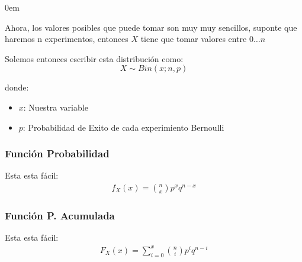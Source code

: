 \documentclass[12pt, fleqn]{report}                             %
\newenvironment{SmallIndentation}[1][0.75em]                    %
        {\begin{adjustwidth}{#1}{}\begin{footnotesize}}             %
        {\end{footnotesize}\end{adjustwidth}}                       %
\theoremstyle{break}                                            %
\begin{document}
\begin{multicols}{2}
\begin{SmallIndentation}[0em]
                            Ahora, los valores posibles que puede tomar son muy muy sencillos, suponte que haremos
                            n experimentos, entonces $X$ tiene que tomar valores entre $0 \dots n$

                            Solemos entonces escribir esta distribución como:
                            \begin{equation*}
                                X \sim Bin(x; n, p)
                            \end{equation*}

                            donde:
                            \begin{itemize}
                                \item $x$: Nuestra variable
                                \item $p$: Probabilidad de Exito de cada experimiento Bernoulli
                            \end{itemize}


                    \subsubsection{Función Probabilidad}
                    
                        Esta esta fácil:
                        \begin{align*}
                            f_X(x) 
                                = {n \choose x} p^x q^{n - x}
                        \end{align*}


                    \subsubsection{Función P. Acumulada}

                        Esta esta fácil:
                        \begin{align*}
                            F_X(x) = \sum_{i=0}^x {n \choose i}p^i q^{n - i}
                        \end{align*}


\end{SmallIndentation}
\end{multicols}
\end{document}
